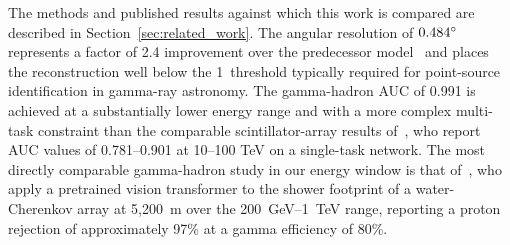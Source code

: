 \begin{table}[ht!]
\centering
\caption[Comparison with state-of-the-art EAS reconstruction.]{Comparison with selected published results on deep learning for EAS reconstruction. \textit{Tasks}: number of simultaneously reconstructed quantities (g/h = gamma-hadron, $\theta$ = zenith angle, $E$ = energy). Dashes indicate metrics not reported or not applicable.}
\label{tab:sota}
\renewcommand{\arraystretch}{1.2}
\end{table}

The methods and published results against which this work is compared are described in Section~\ref{sec:related_work}. The angular resolution of $0.484\degree$ represents a factor of 2.4 improvement over the predecessor model~ and places the reconstruction well below the 1\degree~threshold typically required for point-source identification in gamma-ray astronomy. The gamma-hadron AUC of 0.991 is achieved at a substantially lower energy range and with a more complex multi-task constraint than the comparable scintillator-array results of~, who report AUC values of 0.781--0.901 at 10--100 TeV on a single-task network. The most directly comparable gamma-hadron study in our energy window is that of~, who apply a pretrained vision transformer to the shower footprint of a water-Cherenkov array at 5{,}200~m over the 200~GeV--1~TeV range, reporting a proton rejection of approximately 97\% at a gamma efficiency of 80\%. 

